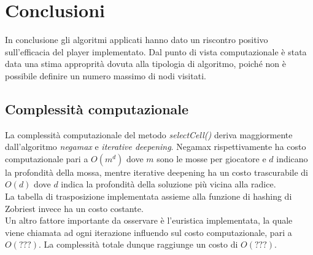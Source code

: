 \documentclass{article}
\begin{document}
    
    
    \section{Conclusioni}
    In conclusione gli algoritmi applicati hanno dato un riscontro positivo sull'efficacia del player implementato. Dal punto di vista computazionale è stata data una stima approprità dovuta alla tipologia di algoritmo, poiché non è possibile definire un numero massimo di nodi visitati.
    
    \subsection{Complessità computazionale}
    La complessità computazionale del metodo \textit{selectCell()} deriva maggiormente dall'algoritmo \textit{negamax} e \textit{iterative deepening}. Negamax rispettivamente ha costo computazionale pari a $O(m^d)$ dove $m$ sono le mosse per giocatore e $d$ indicano la profondità della mossa, mentre iterative deepening ha un costo trascurabile di $O(d)$ dove $d$ indica la profondità della soluzione più vicina alla radice.\\
    La tabella di trasposizione implementata assieme alla funzione di hashing di Zobriest invece ha un costo costante.\\
    Un altro fattore importante da osservare è l'euristica implementata, la quale viene chiamata ad ogni iterazione influendo sul costo computazionale, pari a $O(???)$. La complessità totale dunque raggiunge un costo di $O(???)$.
\end{document}
